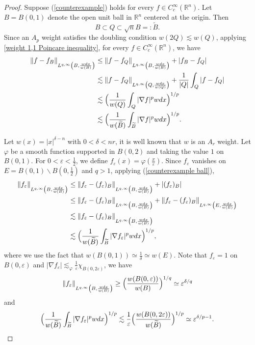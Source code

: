 \documentclass[reqno, 10pt, oneside]{amsart}
\numberwithin{equation}{section}
\newcommand{\strt}[1]{\rule{0pt}{#1}}
\renewcommand{\epsilon}{\varepsilon}
\numberwithin{theorem}{section}
\renewcommand{\epsilon}{\varepsilon}
\newcommand{\R}{{\mathbb R}}
\newcommand{\1}{{\rm 1\hspace*{-0.4ex}%
\rule{0.1ex}{1.52ex}\hspace*{0.2ex}}}
\begin{document}
\begin{proof}
Suppose (\ref{counterexample}) holds for every $f \in C_c^{\infty}(\R^n)$. Let $B=B(0,1)$ denote the open unit ball in $\mathbb{R}^n$ centered at the origin. Then $$B \subset Q \subset \sqrt{n}B =:\widetilde{B}.$$
Since an $A_p$ weight satisfies the doubling condition $w(2Q) \lesssim w(Q)$, applying \eqref{weight 1,1 Poincare inequality}, for every $f \in C_c^{\infty}(\R^n)$, we have
\begin{align}
\|f-f_B\|_{\strt{2.3ex}L^{q,\infty}\left(B, \frac{w dx}{w(B)}\right)} & \le \|f-f_Q\|_{\strt{2.3ex}L^{q,\infty}\left(B, \frac{w dx}{w(B)}\right)}+|f_B-f_Q| \nonumber \\   
& \lesssim \|f-f_Q\|_{\strt{2.3ex}L^{q,\infty}\left(Q, \frac{w dx}{w(Q)}\right)}+\frac{1}{|Q|}\int_{Q}|f-f_Q| \nonumber \\ 
& \lesssim \Big(\frac{1}{w(Q)}\int_{Q}|\nabla f|^p w dx\Big)^{1/p} \nonumber \\
& \lesssim \Big(\frac{1}{w(\widetilde{B})}\int_{\widetilde{B}}|\nabla f|^p w dx\Big)^{1/p}. {\label{counterexample ball}}
\end{align}

Let $w(x)=|x|^{\delta - n}$ with $0 < \delta < nr$, it is well known that $w$ is an $A_r$ weight. Let $\varphi$ be a smooth function supported in $B(0,2)$ and taking the value $1$ on $B(0,1)$. For $0 < \epsilon < \frac{1}{2}$, we define $f_\epsilon(x)=\varphi(\frac{x}{\epsilon})$. Since $f_\epsilon$ vanishes on $E=B(0,1) \backslash B(0,\frac{1}{2})$  and $q>1$, applying ({\ref{counterexample ball}}),
\begin{align}
\|f_\epsilon\|_{\strt{2.3ex} L^{q,\infty}\left(B, \frac{w dx}{w(B)}\right)} & \le \|f_\epsilon - (f_\epsilon)_B\|_{\strt{2.3ex} L^{q,\infty}\left(B, \frac{w dx}{w(B)}\right)} +|(f_\epsilon)_B| \nonumber \\
& \le \|f_\epsilon - (f_\epsilon)_B\|_{\strt{2.3ex} L^{q,\infty}\left(B, \frac{w dx}{w(B)}\right)} + \|f_\epsilon-(f_\epsilon)_B\|_{\strt{2.3ex} L^{q,\infty}\left(E, \frac{w dx}{w(E)}\right)} \nonumber \\
& \lesssim \|f_\epsilon - (f_\epsilon)_B\|_{\strt{2.3ex}L^{q,\infty}\left(B, \frac{w dx}{w(B)}\right)} \nonumber \\
& \lesssim \Big(\frac{1}{w(\widetilde{B})}\int_{\widetilde{B}}|\nabla f_\epsilon|^p w dx\Big)^{1/p}, {\label{counterexample equal}}
\end{align}
where we use the fact that $w(B(0,1)) \simeq \frac{1}{\delta} \simeq w(E)$. Note that $f_\epsilon = 1$ on $B(0,\epsilon)$ and $|\nabla f_\epsilon| \lesssim_{\varphi} \frac{1}{\epsilon}\chi_{B(0,2\epsilon)}$, we have
%
$$\|f_\epsilon\|_{\strt{2.3ex} L^{q,\infty}\left(B, \frac{w dx}{w(B)}\right)} \ge \Big(\frac{w(B(0,\epsilon))}{w(B)}\Big)^{1/q} \simeq \epsilon^{\delta/q} $$
and 
\begin{equation}{\label{counterexample upper bound}}
\Big(\frac{1}{w(\widetilde{B})}\int_{\widetilde{B}}|\nabla f_\epsilon|^p w dx\Big)^{1/p} \lesssim \frac{1}{\epsilon}\Big(\frac{w(B(0,2\epsilon))}{w(\widetilde{B})}\Big)^{1/p} \simeq \epsilon^{\delta/p-1}.    
\end{equation}



\end{proof}
\end{document}
